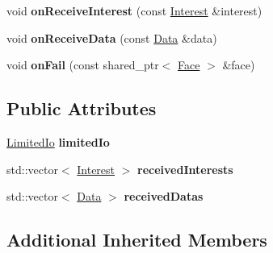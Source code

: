 \begin{DoxyCompactItemize}
\item 
void {\bfseries on\+Receive\+Interest} (const \hyperlink{classndn_1_1Interest}{Interest} \&interest)\hypertarget{classnfd_1_1tests_1_1SimpleEndToEndFixture_ad259337c6bb342f66936e32b2f06741d}{}\label{classnfd_1_1tests_1_1SimpleEndToEndFixture_ad259337c6bb342f66936e32b2f06741d}

\item 
void {\bfseries on\+Receive\+Data} (const \hyperlink{classndn_1_1Data}{Data} \&data)\hypertarget{classnfd_1_1tests_1_1SimpleEndToEndFixture_a53a18a2e27e7efcba8b9c9971c2d9b2e}{}\label{classnfd_1_1tests_1_1SimpleEndToEndFixture_a53a18a2e27e7efcba8b9c9971c2d9b2e}

\item 
void {\bfseries on\+Fail} (const shared\+\_\+ptr$<$ \hyperlink{classnfd_1_1Face}{Face} $>$ \&face)\hypertarget{classnfd_1_1tests_1_1SimpleEndToEndFixture_a46d0b1a692723b796b9dca42ae1da577}{}\label{classnfd_1_1tests_1_1SimpleEndToEndFixture_a46d0b1a692723b796b9dca42ae1da577}

\end{DoxyCompactItemize}
\subsection*{Public Attributes}
\begin{DoxyCompactItemize}
\item 
\hyperlink{classnfd_1_1tests_1_1LimitedIo}{Limited\+Io} {\bfseries limited\+Io}\hypertarget{classnfd_1_1tests_1_1SimpleEndToEndFixture_afed22669c3cafb4201cfeba85691cb43}{}\label{classnfd_1_1tests_1_1SimpleEndToEndFixture_afed22669c3cafb4201cfeba85691cb43}

\item 
std\+::vector$<$ \hyperlink{classndn_1_1Interest}{Interest} $>$ {\bfseries received\+Interests}\hypertarget{classnfd_1_1tests_1_1SimpleEndToEndFixture_a880295144c4a8977e757b3cb3c82e079}{}\label{classnfd_1_1tests_1_1SimpleEndToEndFixture_a880295144c4a8977e757b3cb3c82e079}

\item 
std\+::vector$<$ \hyperlink{classndn_1_1Data}{Data} $>$ {\bfseries received\+Datas}\hypertarget{classnfd_1_1tests_1_1SimpleEndToEndFixture_adebfef19e81f7f9a806b29e48b47a2ad}{}\label{classnfd_1_1tests_1_1SimpleEndToEndFixture_adebfef19e81f7f9a806b29e48b47a2ad}

\end{DoxyCompactItemize}
\subsection*{Additional Inherited Members}


